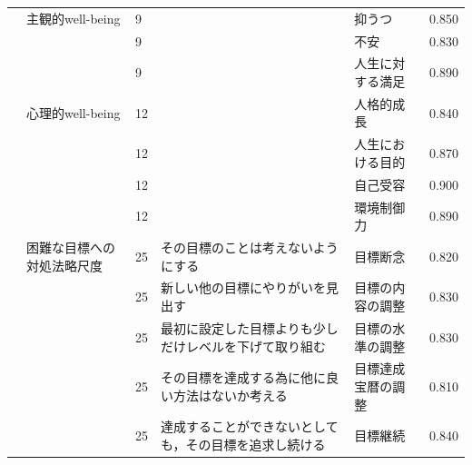 \begin{landscape}
\begin{longtable}{p{2cm}p{2cm}p{2cm}p{6cm}p{2cm}p{2cm}}
                                 & 主観的well-being                    & 9   &                                                     & 抑うつ                  & 0.850   \\
                                 &                                  & 9   &                                                     & 不安                   & 0.830   \\
                                 &                                  & 9   &                                                     & 人生に対する満足             & 0.890   \\
                                 & 心理的well-being                    & 12  &                                                     & 人格的成長                & 0.840   \\
                                 &                                  & 12  &                                                     & 人生における目的             & 0.870   \\
                                 &                                  & 12  &                                                     & 自己受容                 & 0.900   \\
                                 &                                  & 12  &                                                     & 環境制御力                & 0.890   \\
                                 & 困難な目標への対処法略尺度                    & 25  & その目標のことは考えないようにする                                   & 目標断念                 & 0.820   \\
                                 &                                  & 25  & 新しい他の目標にやりがいを見出す                                    & 目標の内容の調整             & 0.830   \\
                                 &                                  & 25  & 最初に設定した目標よりも少しだけレベルを下げて取り組む                         & 目標の水準の調整             & 0.830   \\
                                 &                                  & 25  & その目標を達成する為に他に良い方法はないか考える                            & 目標達成宝暦の調整            & 0.810   \\
                                 &                                  & 25  & 達成することができないとしても，その目標を追求し続ける                         & 目標継続                 & 0.840   \\

\end{longtable}
\end{landscape}
